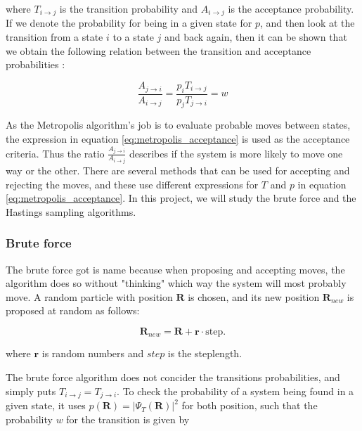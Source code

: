 \documentclass[norsk,a4paper,12pt]{article}
\begin{document}
where $T_{i \rightarrow j}$ is the transition probability and $A_{i \rightarrow j}$ is the acceptance probability. If we denote the probability for being in a given state for $p$, and then look at the transition from a state $i$ to a state $j$ and back again, then it can be shown that we obtain the following relation between the transition and acceptance probabilities \cite{Nordhagen}:

\begin{equation}
\label{eq:metropolis_acceptance}
\frac{A_{j\rightarrow i}}{A_{i\rightarrow j}}=\frac{p_iT_{i\rightarrow j}}{p_jT_{j\rightarrow i}} = w
\end{equation}

As the Metropolis algorithm's job is to evaluate probable moves between states, the expression in equation \ref{eq:metropolis_acceptance} is used as the acceptance criteria. Thus the ratio $\frac{A_{j\rightarrow i}}{A_{i\rightarrow j}}$ describes if the system is more likely to move one way or the other. There are several methods that can be used for accepting and rejecting the moves, and these use different expressions for $T$ and $p$ in equation \ref{eq:metropolis_acceptance}. In this project, we will study the brute force and the Hastings sampling algorithms.

\subsubsection{Brute force}
The brute force got is name because when proposing and accepting moves, the algorithm does so without "thinking" which way the system will most probably move. A random particle with position $\boldsymbol{R}$ is chosen, and its new position $\boldsymbol{R}_{new}$ is proposed at random as follows:

\begin{equation}
\boldsymbol{R}_{new} = \boldsymbol{R} + \boldsymbol{r}\cdot \text{step}.
\end{equation}

where $\boldsymbol{r}$ is random numbers and $step$ is the steplength.
\par 
\vspace{3mm}
The brute force algorithm does not concider the transitions probabilities, and simply puts $T_{i\rightarrow j} = T_{j\rightarrow i}$. To check the probability of a system being found in a given state, it uses $p(\boldsymbol{R})=|\Psi_T(\boldsymbol{R})|^2$ for both position, such that the probability $w$ for the transition is given by
\end{document}
